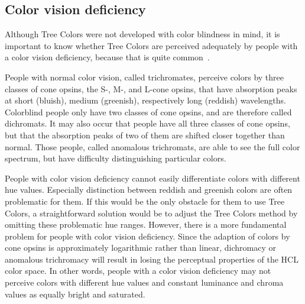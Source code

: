 \documentclass[journal]{vgtc}                %
\begin{document}
\subsection{Color vision deficiency}
Although Tree Colors were not developed with color blindness in mind, it is important to know whether Tree Colors are 
perceived adequately by people with a color vision deficiency, because that is quite common~\cite{birch12}.

People with normal color vision, called trichromates, perceive colors by three classes of cone opsins, the S-, M-, 
and L-cone opsins, that have absorption peaks at short (bluish), medium (greenish),  respectively long (reddish) wavelengths. Colorblind people only have two classes of cone opsins, and are therefore called dichromats. It may also occur that people have all three classes of cone opsins, but that the absorption peaks of two of them are shifted closer together than normal. Those people, called anomalous trichromats, are able to see the full color spectrum, but have difficulty distinguishing particular colors.


People with color vision deficiency cannot easily differentiate colors with different hue values. Especially distinction between reddish and greenish colors are often problematic for them. If this would be the only obstacle for them to use Tree Colors, a straightforward solution would be to adjust the Tree Colors method by omitting these problematic hue ranges. However, there is a more fundamental problem for people with color vision deficiency. Since the adaption of colors by cone opsins is approximately logarithmic rather than linear, dichromacy or anomalous trichromacy will result in losing the perceptual properties of the HCL color space. In other words, people with a color vision deficiency may not perceive colors with different hue values and constant luminance and chroma values as equally bright and saturated.
\end{document}
